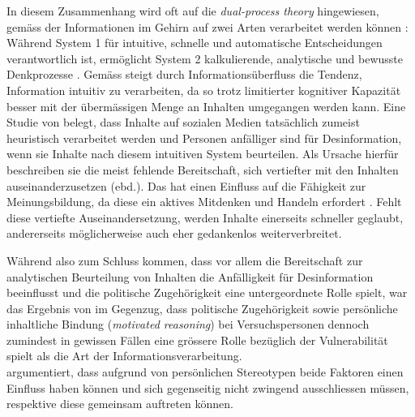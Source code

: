 \documentclass[12pt,a4paper]{article}        %
\begin{document}
In diesem Zusammenhang wird oft auf die \textit{dual-process theory} hingewiesen, gemäss der Informationen im Gehirn auf zwei Arten verarbeitet werden können \parencite[40]{pennycook_lazy_2019}: Während System 1 für intuitive, schnelle und automatische Entscheidungen verantwortlich ist, ermöglicht System 2 kalkulierende, analytische und bewusste Denkprozesse \parencite[249]{hohlfeld_schlechte_2020}. Gemäss \textcite[487]{schaewitz_when_2020} steigt durch Informationsüberfluss die Tendenz, Information intuitiv zu verarbeiten, da so trotz limitierter kognitiver Kapazität besser mit der übermässigen Menge an Inhalten umgegangen werden kann.
Eine Studie von \textcite[48]{pennycook_lazy_2019} belegt, dass Inhalte auf sozialen Medien tatsächlich zumeist heuristisch verarbeitet werden und Personen anfälliger sind für Desinformation, wenn sie Inhalte nach diesem intuitiven System beurteilen. Als Ursache hierfür beschreiben sie die meist fehlende Bereitschaft, sich vertiefter mit den Inhalten auseinanderzusetzen (ebd.). Das hat einen Einfluss auf die Fähigkeit zur Meinungsbildung, da diese ein aktives Mitdenken und Handeln erfordert \parencite[216]{schmidt_meinungsbildung_2022}. Fehlt diese vertiefte Auseinandersetzung, werden Inhalte einerseits schneller geglaubt, andererseits möglicherweise auch eher gedankenlos weiterverbreitet.

Während \citeauthor{pennycook_lazy_2019} also zum Schluss kommen, dass vor allem die Bereitschaft zur analytischen Beurteilung von Inhalten die Anfälligkeit für Desinformation beeinflusst und die politische Zugehörigkeit eine untergeordnete Rolle spielt, war das Ergebnis von \textcite[502]{schaewitz_when_2020} im Gegenzug, dass politische Zugehörigkeit sowie persönliche inhaltliche Bindung (\textit{motivated reasoning}) bei Versuchspersonen dennoch zumindest in gewissen Fällen eine grössere Rolle bezüglich der Vulnerabilität spielt als die Art der Informationsverarbeitung. \\
\textcite[24]{zoglauer_konstruierte_2021} argumentiert, dass aufgrund von persönlichen Stereotypen beide Faktoren einen Einfluss haben können und sich gegenseitig nicht zwingend ausschliessen müssen, respektive diese gemeinsam auftreten können. 
\end{document}

